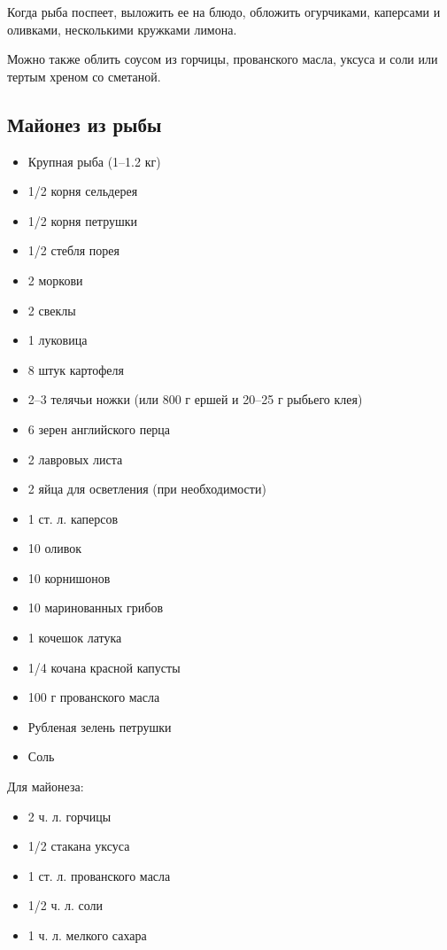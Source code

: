 Когда рыба поспеет, выложить ее на блюдо, обложить огурчиками, каперсами и оливками, несколькими кружками лимона.

Можно также облить соусом из горчицы, прованского масла, уксуса и соли или тертым хреном со сметаной.

\subsection{Майонез из рыбы}\label{13majonez-ryb}

\begin{itemize}
	\item Крупная рыба (1–1.2 кг)
    \item 1/2 корня сельдерея 
    \item 1/2 корня петрушки
    \item 1/2 стебля порея
    \item 2 моркови 
    \item 2 свеклы
    \item 1 луковица 
    \item 8 штук картофеля
    \item 2–3 телячьи ножки (или 800 г ершей и 20–25 г рыбьего клея) 
    \item 6 зерен английского перца 
    \item 2 лавровых листа
    \item 2 яйца для осветления (при необходимости) 
    \item 1 ст. л. каперсов 
    \item 10 оливок 
    \item 10 корнишонов
    \item 10 маринованных грибов 
    \item 1 кочешок латука
    \item 1/4 кочана красной капусты
    \item 100 г прованского масла
    \item Рубленая зелень петрушки
    \item Соль
\end{itemize}

Для майонеза: 

\begin{itemize}
	\item 2 ч. л. горчицы 
    \item 1/2 стакана уксуса
    \item 1 ст. л. прованского масла
    \item 1/2 ч. л. соли 
    \item 1 ч. л. мелкого сахара
\end{itemize}

